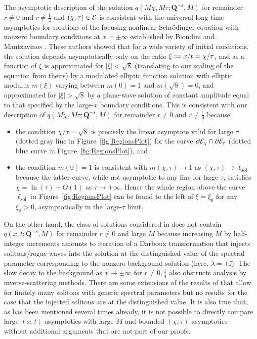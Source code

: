 The asymptotic description of the solution $q(M\chi,M\tau;\mathbf{Q}^{-s},M)$ for remainder $r\neq 0$ and $r\neq\tfrac{1}{4}$ and $(\chi,\tau)\in\mathcal{E}$ is consistent with the universal long-time asymptotics for solutions of the focusing nonlinear Schr\"odinger equation with nonzero boundary conditions at $x=\pm\infty$ established by Biondini and Mantzavinos \cite{BiondiniM17}.  These authors showed that for a wide variety of initial conditions, the solution depends asymptotically only on the ratio $\xi\vcentcolon= x/t=\chi/\tau$, and as a function of $\xi$ is approximated for $|\xi|<\sqrt{8}$ (translating to our scaling of the equation from theirs) by a modulated elliptic function solution with elliptic modulus $m(\xi)$ varying between $m(0)=1$ and $m(\sqrt{8})=0$, and approximated for $|\xi|>\sqrt{8}$ by a plane-wave solution of constant amplitude equal to that specified by the large-$x$ boundary conditions.  This is consistent with our description of $q(M\chi,M\tau;\mathbf{Q}^{-s},M)$ for remainder $r\neq 0$ and $r\neq\tfrac{1}{4}$ because 
\begin{itemize}
\item
the condition $\chi/\tau=\sqrt{8}$ is precisely the linear asymptote valid for large $\tau$ (dotted gray line in Figure~\ref{fig:RegionsPlot}) for the curve $\partial\mathcal{E}_\chi\cap\partial\mathcal{E}_\tau$ (dotted blue curve in Figure~\ref{fig:RegionsPlot}), and 
\item
the condition $m(0)=1$ is consistent with $m(\chi,\tau)\to 1$ as $(\chi,\tau)\to\ell_\mathrm{sol}$ because the latter curve, while not asymptotic to any line for large $\tau$, satisfies 
$\chi=\ln(\tau)+O(1)$ as $\tau\to +\infty$.  Hence the whole region above the curve $\ell_\mathrm{sol}$ in Figure~\ref{fig:RegionsPlot} can be found to the left of $\xi=\xi_0$ for any $\xi_0>0$, asymptotically in the large-$\tau$ limit.
\end{itemize}
On the other hand, the class of solutions considered in \cite{BiondiniM17} does not contain $q(x,t;\mathbf{Q}^{-s},M)$ for remainder $r\neq 0$ and large $M$ because increasing $M$ by half-integer increments amounts to iteration of a Darboux transformation \cite{BilmanM19} that injects solitons/rogue waves into the solution at the distinguished value of the spectral parameter corresponding to the nonzero background solution (here, $\lambda=\pm\ii$).  The slow decay to the background as $x\to\pm\infty$ for  $r\neq 0,\tfrac{1}{4}$ also obstructs analysis by inverse-scattering methods.  There are some extensions of the results of \cite{BiondiniM17} that allow for finitely many solitons with generic spectral parameters but no results for the case that the injected solitons are at the distinguished value.  It is also true that, as has been mentioned several times already, it is not possible to directly compare large-$(x,t)$ asymptotics with large-$M$ and bounded $(\chi,\tau)$ asymptotics without additional arguments that are not part of our proofs.

